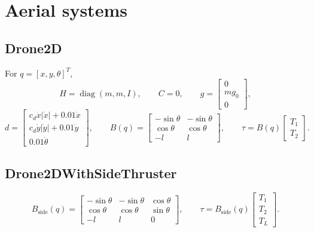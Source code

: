 \documentclass[11pt]{article}
\newcommand{\diag}{\operatorname{diag}}
\begin{document}
\section{Aerial systems}

\subsection{Drone2D}
For \(q=[x,y,\theta]^T\),
\begin{equation}
    H=\diag(m,m,I),
    \qquad
    C=0,
    \qquad
    g=\begin{bmatrix}0\\mg_0\\0\end{bmatrix},
\end{equation}
\begin{equation}
    d=
    \begin{bmatrix}
        c_d\dot x|\dot x|+0.01\dot x\\
        c_d\dot y|\dot y|+0.01\dot y\\
        0.01\dot\theta
    \end{bmatrix},
    \qquad
    B(q)=
    \begin{bmatrix}
        -\sin\theta & -\sin\theta\\
        \cos\theta & \cos\theta\\
        -l & l
    \end{bmatrix},
    \qquad
    \tau=B(q)\begin{bmatrix}T_1\\T_2\end{bmatrix}.
\end{equation}

\subsection{Drone2DWithSideThruster}
\begin{equation}
    B_{\mathrm{side}}(q)=
    \begin{bmatrix}
        -\sin\theta & -\sin\theta & \cos\theta\\
        \cos\theta & \cos\theta & \sin\theta\\
        -l & l & 0
    \end{bmatrix},
    \qquad
    \tau=B_{\mathrm{side}}(q)
    \begin{bmatrix}T_1\\T_2\\T_L\end{bmatrix}.
\end{equation}
\end{document}
